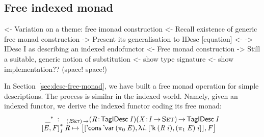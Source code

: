 \subsection{Free indexed monad}

\begin{wstructure}
<- Variation on a theme: free imonad construction
    <- Recall existence of generic free monad construction
    -> Present its generalisation to IDesc [equation]
        <- \I -> IDesc I as describing an indexed endofunctor
        <- Free monad construction
    -> Still a suitable, generic notion of substitution
        <- show type signature
        <- show implementation?? (space! space!)
\end{wstructure}

In Section~\ref{sec:desc-free-monad}, we have built a free monad
operation for simple descriptions. The process is similar in the
indexed world. Namely, given an indexed functor, we derive the indexed
functor coding its free monad: 
%
\[\stk{
\begin{array}{ll}
\FreeIMonad{\_}{} : & _{\PI{\V{I}}{\Set}}
                     \PITEL{\V{R}}{\TagIDesc{\V{I}}} 
                     \PITEL{\V{X}}{\V{I} \To \Set}\To 
                      \TagIDesc{\V{I}}
\end{array} \\
\FreeIMonad{\pair{\V{E}}{\V{F}}{}}{\V{I}}{\V{R}} \mapsto
    \pair{\pair{\ListCons{\SYMBDVar}{(\fst{\V{E}})}} 
               {\LAM{\V{i}}
                \pair{\DConst{(\V{R}\: \V{i})}}
                     {(\snd{\V{E}})\: \V{i}}{}}{}}
         {\V{F}}{}
}\]


\newcommand{\substI}{\F{substI}}


